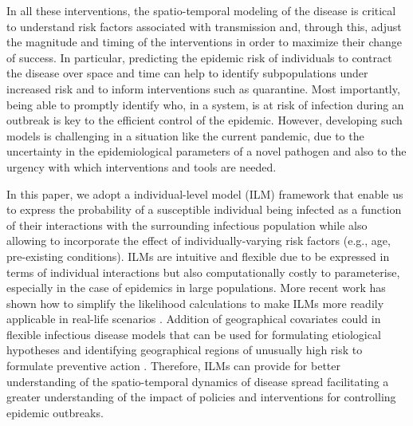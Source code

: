 \documentclass{article}
\begin{document}
In all these interventions, the spatio-temporal modeling of the disease is critical to understand risk factors associated with transmission and, through this, adjust the magnitude and timing of the interventions in order to maximize their change of success. In particular, predicting the epidemic risk of individuals to contract the disease over space and time can help to identify subpopulations under increased risk and to inform interventions such as quarantine. Most importantly, being able to promptly identify who, in a system, is at risk of infection during an outbreak is key to the efficient control of the epidemic. However, developing such models is challenging in a situation like the current pandemic, due to the uncertainty in the epidemiological parameters of a novel pathogen and also to the urgency with which interventions and tools are needed.

In this paper, we adopt a individual-level model (ILM) framework that enable us to express the probability of a susceptible individual being infected as a function of their interactions with the surrounding infectious population while also allowing to incorporate the effect of individually-varying risk factors (e.g., age, pre-existing conditions). ILMs are intuitive and flexible due to be expressed in terms of individual interactions \cite{Gibson1997, Keeling2001, Neal2004} but also computationally costly to parameterise, especially in the case of epidemics in large populations. More recent work has shown how to simplify the likelihood calculations to make ILMs more readily applicable in real-life scenarios \cite{Deardon2010}. Addition of geographical covariates could in flexible infectious disease models that can be used for formulating etiological hypotheses and identifying geographical regions of unusually high risk to formulate preventive action \cite{Mahsin2020}. Therefore, ILMs can provide for better understanding of the spatio-temporal dynamics of disease spread facilitating a greater understanding of the impact of policies and interventions for controlling epidemic outbreaks.
 
\end{document}
